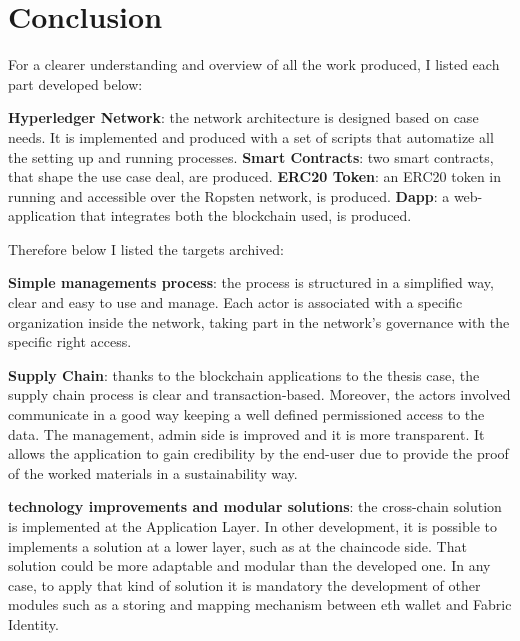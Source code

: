 \chapter{Conclusion}

For a clearer understanding and overview of all the work produced, I listed each part developed below:

\begin{outline}
    \1 \textbf{Hyperledger Network}: the network architecture is designed based on case needs. It is 
    implemented and produced with a set of scripts that automatize all the setting up and running processes.
    \1 \textbf{Smart Contracts}: two smart contracts, that shape the use case deal, are produced.
    \1 \textbf{ERC20 Token}: an ERC20 token in running and accessible over the Ropsten network, is produced.
    \1 \textbf{Dapp}: a web-application that integrates both the blockchain used, is produced.
\end{outline}

Therefore below I listed the targets archived:

\begin{outline}
    \1 \textbf{Simple managements process}: the process is structured in a simplified way, clear and easy
    to use and manage. Each actor is associated with a specific organization inside the network, taking part 
    in the network's governance with the specific right access.

    \1 \textbf{Supply Chain}: thanks to the blockchain applications to the thesis case, the supply chain process is
    clear and transaction-based. Moreover, the actors involved communicate in a good way keeping a well defined 
    permissioned access to the data. The management, admin side is improved and it is more transparent. It allows the 
    application to gain credibility by the end-user due to provide the proof of the worked materials in a sustainability 
    way.

    \1 \textbf{technology improvements and modular solutions}: the cross-chain solution is implemented at the 
    Application Layer. In other development, it is possible to implements a solution at a lower layer, such as 
    at the chaincode side. That solution could be more adaptable and modular than the developed one. In any case, 
    to apply that kind of solution it is mandatory the development of other modules such as a storing and mapping 
    mechanism between eth wallet and Fabric Identity.
\end{outline}

